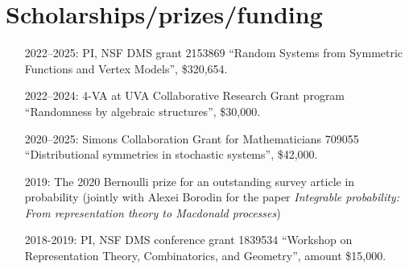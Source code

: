 \documentclass[letterpaper,11pt]{article}
\begin{document}
\section*{Scholarships/prizes/funding}
\begin{itemize}
	\item [2022--2025:]
	PI, NSF DMS grant 2153869 
	``Random Systems from Symmetric Functions and Vertex Models'',
	\$320,654.

	\item [2022--2024:]
	4-VA at UVA Collaborative Research Grant program
	``Randomness by algebraic structures'',
	\$30,000.

	\item [2020--2025:]
		Simons Collaboration Grant for Mathematicians 709055
		``Distributional symmetries in stochastic systems'',
		\$42,000.
	\item [2019:] 
		The 2020 Bernoulli prize for an outstanding survey article in probability 
		(jointly with Alexei Borodin for the paper \emph{Integrable probability: From representation theory to
		Macdonald processes})
	\item
		[2018-2019:] PI,
				NSF DMS conference grant 
				1839534
				``Workshop on Representation Theory, Combinatorics, and Geometry'',
				amount \$15,000.


\end{itemize}
\end{document}
